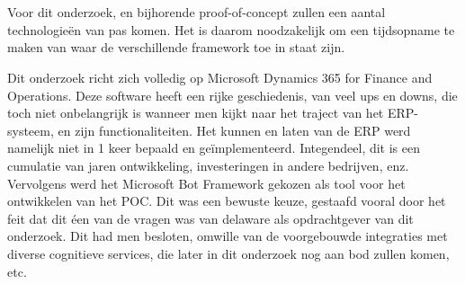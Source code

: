 \chapter{}
\label{ch:stand-van-zaken}
Voor dit onderzoek, en bijhorende proof-of-concept zullen een aantal technologieën van pas komen. Het is daarom noodzakelijk om een tijdsopname te maken van waar de verschillende framework toe in staat zijn. 

Dit onderzoek richt zich volledig op Microsoft Dynamics 365 for Finance and Operations. Deze software heeft een rijke geschiedenis, van veel ups en downs, die toch niet onbelangrijk is wanneer men kijkt naar het traject van het ERP-systeem, en zijn functionaliteiten. Het kunnen en laten van de ERP werd namelijk niet in 1 keer bepaald en geïmplementeerd. Integendeel, dit is een cumulatie van jaren ontwikkeling, investeringen in andere bedrijven, enz.  
Vervolgens werd het Microsoft Bot Framework gekozen als tool voor het ontwikkelen van het POC. Dit was een bewuste keuze, gestaafd vooral door het feit dat dit éen van de vragen was van delaware als opdrachtgever van dit onderzoek. Dit had men besloten, omwille van de voorgebouwde integraties met diverse cognitieve services, die later in dit onderzoek nog aan bod zullen komen, etc.

